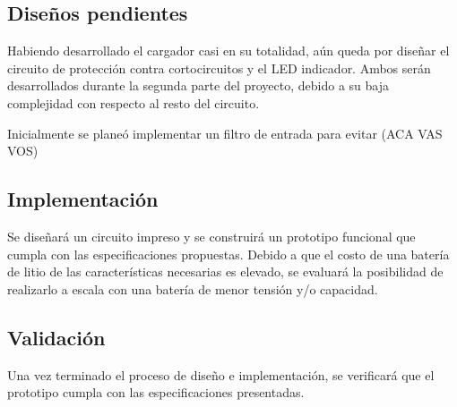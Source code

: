 \subsection{Diseños pendientes}
Habiendo desarrollado el cargador casi en su totalidad, aún queda por diseñar el circuito de protección
contra cortocircuitos y el LED indicador. Ambos serán desarrollados durante la segunda parte del proyecto,
debido a su baja complejidad con respecto al resto del circuito.

Inicialmente se planeó implementar un filtro de entrada para evitar (ACA VAS VOS)

\subsection{Implementación}
Se diseñará un circuito impreso y se construirá un prototipo funcional que cumpla con las especificaciones propuestas. 
Debido a que el costo de una batería de litio de las características necesarias es elevado,
se evaluará la posibilidad de realizarlo a escala con una batería de menor tensión y/o capacidad.

\subsection{Validación}
Una vez terminado el proceso de diseño e implementación,
se verificará que el prototipo cumpla con las especificaciones presentadas.
